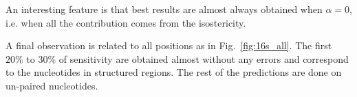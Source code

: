 An interesting feature is that best results are almost always obtained when $\alpha=0$, i.e. when all the contribution
comes from the isostericity.

A final observation is related to  all positions as in Fig.~\ref{fig:16s_all}. The first $20\%$ to $30\%$ of sensitivity are obtained almost without any errors and correspond to the nucleotides in 
structured regions. The rest of the predictions are done on un-paired nucleotides.

